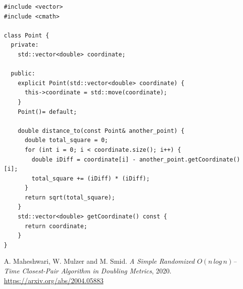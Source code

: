 \documentclass[12pt,english,]{article}
\begin{document}
\begin{lstlisting}
#include <vector>
#include <cmath>

class Point {
  private:
    std::vector<double> coordinate;

  public:
    explicit Point(std::vector<double> coordinate) {
      this->coordinate = std::move(coordinate);
    }
    Point()= default;

    double distance_to(const Point& another_point) {
      double total_square = 0;
      for (int i = 0; i < coordinate.size(); i++) {
        double iDiff = coordinate[i] - another_point.getCoordinate()[i];
        total_square += (iDiff) * (iDiff);
      }
      return sqrt(total_square);
    }
    std::vector<double> getCoordinate() const {
      return coordinate;
    }
}
\end{lstlisting}

\medskip

\begin{thebibliography}{9}
A. Maheshwari, W. Mulzer and M. Smid. \emph{A Simple Randomized $O(n\,log\,n)$–Time Closest-Pair Algorithm in Doubling Metrics}, 2020. \url{https://arxiv.org/abs/2004.05883}
\end{thebibliography}
\end{document}

